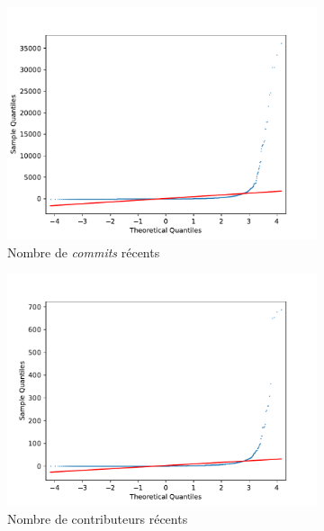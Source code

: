\documentclass[dvipsnames,runningheads]{llncs}
\begin{document}
    \begin{figure}[ht]
        \begin{subfigure}[t]{0.3\textwidth}
            \includegraphics[width=\textwidth]{../experiment/data_analysis/recentCommitCount_qqplot}
            \caption{Nombre de \emph{commits} récents}
        \end{subfigure}
        \begin{subfigure}[t]{0.3\textwidth}
            \includegraphics[width=\textwidth]{../experiment/data_analysis/recentContributorCount_qqplot}
            \caption{Nombre de contributeurs récents}
        \end{subfigure}%
        \begin{subfigure}[t]{0.3\textwidth}

\end{subfigure}
\end{figure}
\end{document}
